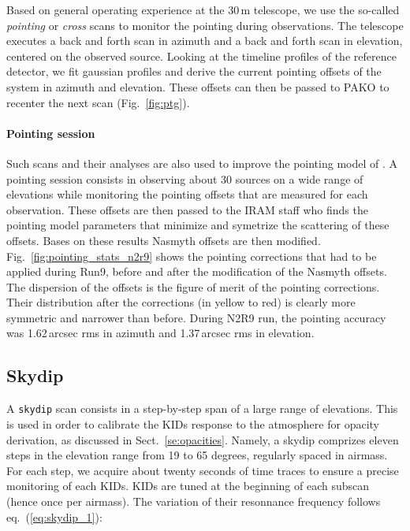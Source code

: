 Based on general operating experience at the 30\,m telescope, we use the so-called
{\em pointing} or {\em cross} scans to monitor the pointing during observations. The
telescope executes a back and forth scan in azimuth and a back and forth scan in
elevation, centered on the observed source. Looking at the timeline profiles of
the reference detector, we fit gaussian profiles and derive the current pointing
offsets of the system in azimuth and elevation. These offsets can then be passed
to PAKO to recenter the next scan (Fig.~\ref{fig:ptg}).

\paragraph{Pointing session}
\label{se:pointing_session}

Such scans and their analyses are also used to improve the pointing model of
\nika. A pointing session consists in observing about 30 sources on a wide range
of elevations while monitoring the pointing offsets that are measured for each
observation. These offsets are then passed to the IRAM staff who finds the
pointing model parameters that minimize and symetrize the scattering of these
offsets. Bases on these results Nasmyth offsets are then
modified. Fig.~\ref{fig:pointing_stats_n2r9} shows the pointing corrections that
had to be applied during Run9, before and after the modification of the Nasmyth
offsets. The dispersion of the offsets is the figure of merit of the pointing
corrections. Their distribution after the corrections (in yellow to
red) is clearly more symmetric and narrower than before. During N2R9 run, the
pointing accuracy was 1.62\,arcsec rms in azimuth and 1.37\,arcsec rms in
elevation.

\subsection{Skydip}
\label{se:skydip}

A {\tt skydip} scan consists in a step-by-step span of a large range
of elevations.  This is used in order to calibrate the KIDs response
to the atmosphere for opacity derivation, as discussed in
Sect.~\ref{se:opacities}.  Namely, a skydip comprizes eleven steps in
the elevation range from 19 to 65 degrees, regularly spaced in
airmass. For each step, we acquire about twenty seconds of time traces
to ensure a precise monitoring of each KIDs. KIDs are tuned at the beginning of
each subscan (hence once per airmass). The variation of their resonnance
frequency follows eq.~(\ref{eq:skydip_1}):

